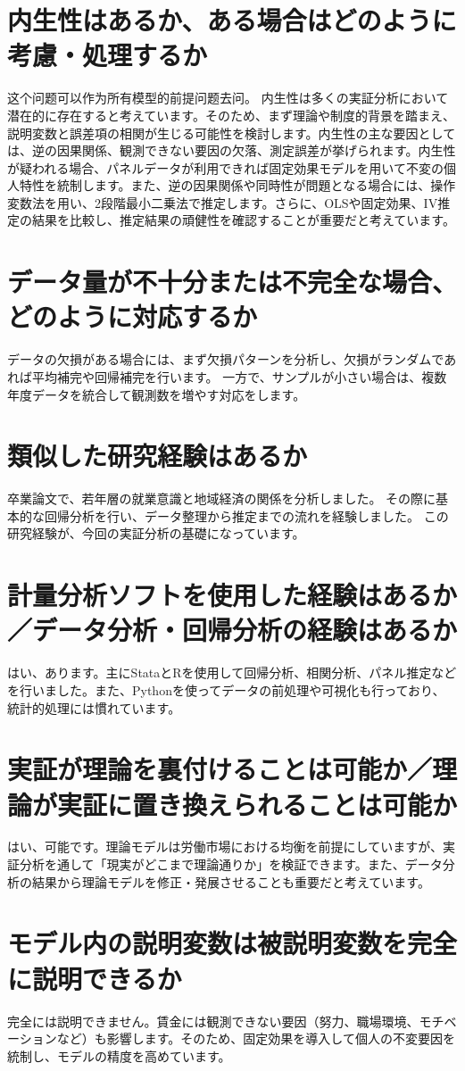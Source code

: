 \documentclass[xelatex,a4paper,base=11pt,ja=standard,jafont=noto]{bxjsreport}
\begin{document}
\section{内生性はあるか、ある場合はどのように考慮・処理するか}
这个问题可以作为所有模型的前提问题去问。
内生性は多くの実証分析において潜在的に存在すると考えています。そのため、まず理論や制度的背景を踏まえ、説明変数と誤差項の相関が生じる可能性を検討します。内生性の主な要因としては、逆の因果関係、観測できない要因の欠落、測定誤差が挙げられます。内生性が疑われる場合、パネルデータが利用できれば固定効果モデルを用いて不変の個人特性を統制します。また、逆の因果関係や同時性が問題となる場合には、操作変数法を用い、2段階最小二乗法で推定します。さらに、OLSや固定効果、IV推定の結果を比較し、推定結果の頑健性を確認することが重要だと考えています。
\section{データ量が不十分または不完全な場合、どのように対応するか}
データの欠損がある場合には、まず欠損パターンを分析し、欠損がランダムであれば平均補完や回帰補完を行います。
一方で、サンプルが小さい場合は、複数年度データを統合して観測数を増やす対応をします。
\section{類似した研究経験はあるか}
卒業論文で、若年層の就業意識と地域経済の関係を分析しました。
その際に基本的な回帰分析を行い、データ整理から推定までの流れを経験しました。
この研究経験が、今回の実証分析の基礎になっています。
\section{計量分析ソフトを使用した経験はあるか／データ分析・回帰分析の経験はあるか}
はい、あります。主にStataとRを使用して回帰分析、相関分析、パネル推定などを行いました。また、Pythonを使ってデータの前処理や可視化も行っており、統計的処理には慣れています。
\section{実証が理論を裏付けることは可能か／理論が実証に置き換えられることは可能か}
はい、可能です。理論モデルは労働市場における均衡を前提にしていますが、実証分析を通して「現実がどこまで理論通りか」を検証できます。また、データ分析の結果から理論モデルを修正・発展させることも重要だと考えています。

\section{モデル内の説明変数は被説明変数を完全に説明できるか}
完全には説明できません。賃金には観測できない要因（努力、職場環境、モチベーションなど）も影響します。そのため、固定効果を導入して個人の不変要因を統制し、モデルの精度を高めています。
\end{document}
